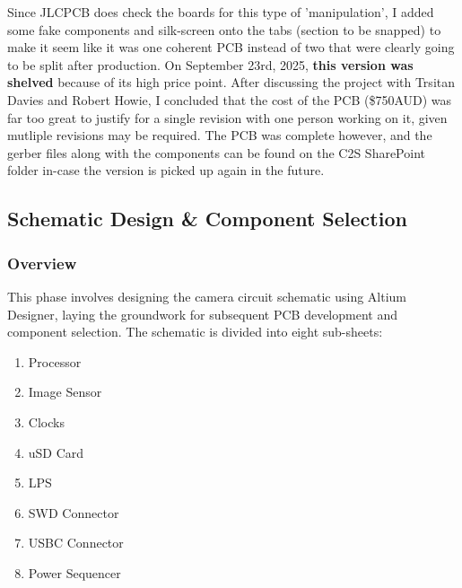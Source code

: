 \documentclass[10pt]{article}
\newcommand{\nl}{\newline \newline}
\begin{document}
Since JLCPCB does check the boards for this type of 'manipulation', I added some fake components and silk-screen onto the tabs (section to be snapped) to make it seem like it was one coherent PCB instead of two that were clearly going to be split after production.
\nl
On September 23rd, 2025, \textbf{this version was shelved} because of its high price point. After discussing the project with Trsitan Davies and Robert Howie, I concluded that the cost of the PCB (\$750AUD) was far too great to justify for a single revision with one person working on it, given mutliple revisions may be required.
The PCB was complete however, and the gerber files along with the components can be found on the C2S SharePoint folder in-case the version is picked up again in the future.

\subsection{Schematic Design \& Component Selection} \label{sec:schematic}

\subsubsection{Overview}
This phase involves designing the camera circuit schematic using Altium Designer, laying the groundwork for subsequent PCB development and component selection.
\nl
The schematic is divided into eight sub-sheets:
\begin{enumerate}[noitemsep]
    \item Processor
    \item Image Sensor
    \item Clocks
    \item uSD Card
    \item LPS
    \item SWD Connector
    \item USBC Connector
    \item Power Sequencer
\end{enumerate}


\end{document}
